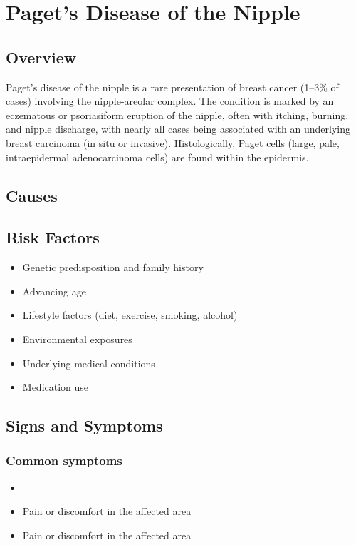 \chapter{Paget's Disease of the Nipple}
\label{sec:Paget's Disease of the Nipple}

\section{Overview}
Paget's disease of the nipple is a rare presentation of breast cancer (1--3\% of cases) involving the nipple-areolar complex. The condition is marked by an eczematous or psoriasiform eruption of the nipple, often with itching, burning, and nipple discharge, with nearly all cases being associated with an underlying breast carcinoma (in situ or invasive). Histologically, Paget cells (large, pale, intraepidermal adenocarcinoma cells) are found within the epidermis.
\section{Causes}
\section{Risk Factors}

\begin{itemize}[noitemsep]
  \item Genetic predisposition and family history
  \item Advancing age
  \item Lifestyle factors (diet, exercise, smoking, alcohol)
  \item Environmental exposures
  \item Underlying medical conditions
  \item Medication use
\end{itemize}
\section{Signs and Symptoms}

\subsection{Common symptoms}
\begin{itemize}[noitemsep]
  \item \item Pain or discomfort in the affected area    \item Pain or discomfort in the affected area
  \end{itemize}

